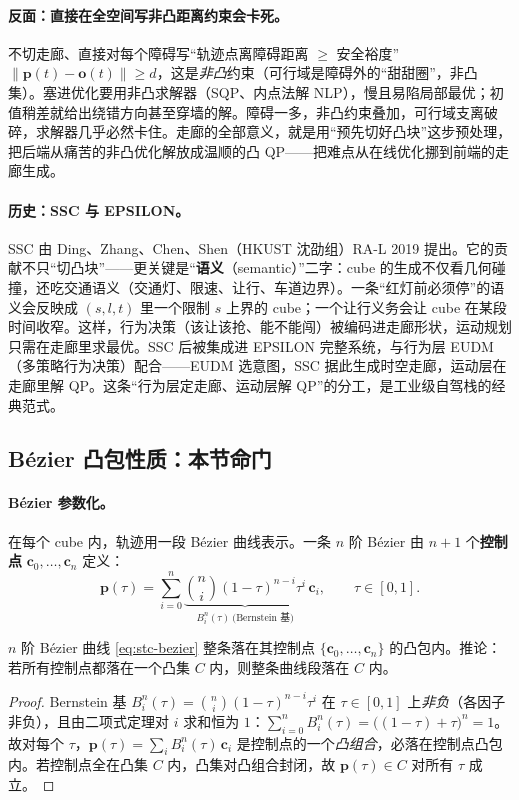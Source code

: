 \paragraph{反面：直接在全空间写非凸距离约束会卡死。}
不切走廊、直接对每个障碍写“轨迹点离障碍距离 $\ge$ 安全裕度” $\|\mathbf{p}(t)-\mathbf{o}(t)\|\ge d$，这是\emph{非凸}约束（可行域是障碍外的“甜甜圈”，非凸集）。塞进优化要用非凸求解器（SQP、内点法解 NLP），慢且易陷局部最优；初值稍差就给出绕错方向甚至穿墙的解。障碍一多，非凸约束叠加，可行域支离破碎，求解器几乎必然卡住。走廊的全部意义，就是用“预先切好凸块”这步预处理，把后端从痛苦的非凸优化解放成温顺的凸 QP——把难点从在线优化挪到前端的走廊生成。

\paragraph{历史：SSC 与 EPSILON。}
SSC 由 Ding、Zhang、Chen、Shen（HKUST 沈劭组）RA-L 2019 提出\cite{ding2019ssc}。它的贡献不只“切凸块”——更关键是“\textbf{语义}（semantic）”二字：cube 的生成不仅看几何碰撞，还吃交通语义（交通灯、限速、让行、车道边界）。一条“红灯前必须停”的语义会反映成 $(s,l,t)$ 里一个限制 $s$ 上界的 cube；一个让行义务会让 cube 在某段时间收窄。这样，行为决策（该让该抢、能不能闯）被编码进走廊形状，运动规划只需在走廊里求最优。SSC 后被集成进 EPSILON 完整系统，与行为层 EUDM（多策略行为决策）配合——EUDM 选意图，SSC 据此生成时空走廊，运动层在走廊里解 QP。这条“行为层定走廊、运动层解 QP”的分工，是工业级自驾栈的经典范式。

\subsection{Bézier 凸包性质：本节命门}
\label{sec:stc-bezier}

\paragraph{Bézier 参数化。}
在每个 cube 内，轨迹用一段 Bézier 曲线表示。一条 $n$ 阶 Bézier 由 $n+1$ 个\textbf{控制点} $\mathbf{c}_0,\dots,\mathbf{c}_n$ 定义：
\begin{equation}
  \mathbf{p}(\tau)=\sum_{i=0}^{n}\underbrace{\binom{n}{i}(1-\tau)^{n-i}\tau^{i}}_{B_i^n(\tau)\ \text{(Bernstein 基)}}\,\mathbf{c}_i,\qquad \tau\in[0,1].
  \label{eq:stc-bezier}
\end{equation}

\begin{theorem}\label{thm:stc-convexhull}
$n$ 阶 Bézier 曲线 \cref{eq:stc-bezier} 整条落在其控制点 $\{\mathbf{c}_0,\dots,\mathbf{c}_n\}$ 的凸包内。推论：若所有控制点都落在一个凸集 $C$ 内，则整条曲线段落在 $C$ 内。
\end{theorem}
\begin{proof}
Bernstein 基 $B_i^n(\tau)=\binom{n}{i}(1-\tau)^{n-i}\tau^i$ 在 $\tau\in[0,1]$ 上\emph{非负}（各因子非负），且由二项式定理对 $i$ 求和恒为 $1$：$\sum_{i=0}^n B_i^n(\tau)=\big((1-\tau)+\tau\big)^n=1$。故对每个 $\tau$，$\mathbf{p}(\tau)=\sum_i B_i^n(\tau)\,\mathbf{c}_i$ 是控制点的一个\emph{凸组合}，必落在控制点凸包内。若控制点全在凸集 $C$ 内，凸集对凸组合封闭，故 $\mathbf{p}(\tau)\in C$ 对所有 $\tau$ 成立。
\end{proof}

